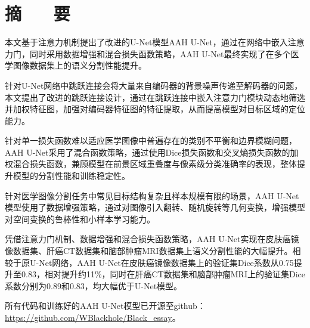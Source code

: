 \section*{ \centering 摘 ~~ 要}

\vskip0.5cm

本文基于注意力机制提出了改进的U-Net模型AAH U-Net，通过在网络中嵌入注意力门，同时采用数据增强和混合损失函数策略，AAH U-Net最终实现了在多个医学图像数据集上的语义分割性能提升。

针对U-Net网络中跳跃连接会将大量来自编码器的背景噪声传递至解码器的问题，本文提出了改进的跳跃连接设计，通过在跳跃连接中嵌入注意力门模块动态地筛选并加权特征图，加强对编码器特征图的特征提取，从而提高模型对目标区域的定位能力。

针对单一损失函数难以适应医学图像中普遍存在的类别不平衡和边界模糊问题，AAH U-Net采用了混合函数策略，通过使用Dice损失函数和交叉熵损失函数的加权混合损失函数，兼顾模型在前景区域重叠度与像素级分类准确率的表现，整体提升模型的分割性能和训练稳定性。

针对医学图像分割任务中常见目标结构复杂且样本规模有限的场景，AAH U-Net模型使用了数据增强策略，通过对图像引入翻转、随机旋转等几何变换，增强模型对空间变换的鲁棒性和小样本学习能力。

凭借注意力门机制、数据增强和混合损失函数策略，AAH U-Net实现在皮肤癌镜像数据集、肝癌CT数据集和脑部肿瘤MRI数据集上语义分割性能的大幅提升。相较于原U-Net网络，AAH U-Net在皮肤癌镜像数据集上的验证集Dice系数从0.75提升至0.83，相对提升约11\%，同时在肝癌CT数据集和脑部肿瘤MRI上的验证集Dice系数分别为0.89和0.83，均大幅优于U-Net模型。

所有代码和训练好的AAH U-Net模型已开源至github：\url{https://github.com/WBlackhole/Black_essay}。



\vskip0.5cm

